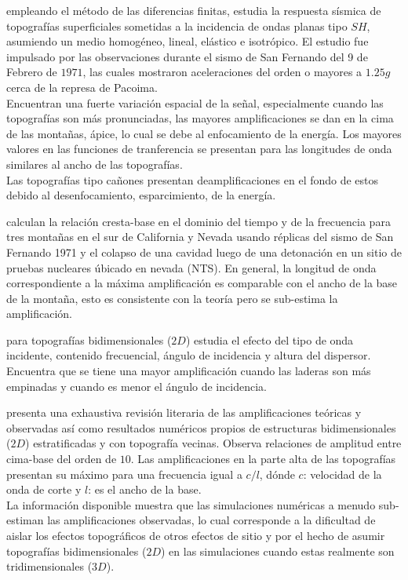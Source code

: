 \documentclass[spanish,letterpaper,12pt,twoside,openany]{article}
\begin{document}
\citep{boore1972note} empleando el método de las diferencias finitas, estudia la respuesta sísmica de topografías superficiales sometidas a la incidencia de ondas planas tipo $SH$, asumiendo un medio homogéneo, lineal, elástico e isotrópico. El estudio fue impulsado por las observaciones durante el sismo de San Fernando del 9 de Febrero de $1971$, las cuales mostraron aceleraciones del orden o mayores a $1.25g$ cerca de la represa de Pacoima.\\
%
Encuentran una fuerte variación espacial de la señal, especialmente cuando las topografías son más pronunciadas, las mayores amplificaciones se dan en la cima de las montañas, ápice, lo cual se debe al enfocamiento de la energía. Los mayores valores en las funciones de tranferencia se presentan para las longitudes de onda similares al ancho de las topografías.\\
%
Las topografías tipo cañones presentan deamplificaciones en el fondo de estos debido al desenfocamiento, esparcimiento, de la energía.

\citep{Davis1973} calculan la relación cresta-base en el dominio del tiempo y de la frecuencia para tres montañas en el sur de California y Nevada usando réplicas del sismo de San Fernando 1971 y el colapso de una cavidad luego de una detonación en un sitio de pruebas nucleares úbicado en nevada (NTS). En general, la longitud de onda correspondiente a la máxima amplificación es comparable con el ancho de la base de la montaña, esto es consistente con la teoría pero se sub-estima la amplificación.

\citep{Bard1982} para topografías bidimensionales ($2D$) estudia el efecto del tipo de onda incidente, contenido frecuencial, ángulo de incidencia y altura del dispersor. Encuentra que se tiene una mayor amplificación cuando las laderas son más empinadas y cuando es menor el ángulo de incidencia.

\citep{Geli1988} presenta una exhaustiva revisión literaria de las amplificaciones teóricas y observadas así como resultados numéricos propios de estructuras bidimensionales ($2D$) estratificadas y con topografía vecinas. Observa relaciones de amplitud entre cima-base del orden de $10$. Las amplificaciones en la parte alta de las topografías presentan su máximo para una frecuencia igual a $c/l$, dónde $c$: velocidad de la onda de corte y $l$: es el ancho de la base.\\
%
La información disponible muestra que las simulaciones numéricas a menudo sub-estiman las amplificaciones observadas, lo cual corresponde a la dificultad de aislar los efectos topográficos de otros efectos de sitio y por el hecho de asumir topografías bidimensionales ($2D$) en las simulaciones cuando estas realmente son tridimensionales ($3D$).
\end{document}
